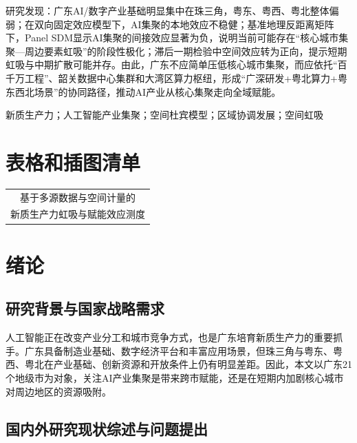 \documentclass[12pt, a4paper]{ctexart}
\makeatletter
\newcommand{\papertitlelineone}{基于多源数据与空间计量的}
\newcommand{\papertitlelinetwo}{新质生产力虹吸与赋能效应测度}
\newcommand{\paperdisplaytitle}{%
    \begin{tabular}[c]{@{}c@{}}
        \papertitlelineone\\[0.18cm]
        \papertitlelinetwo
    \end{tabular}%
}
\newcommand{\paperxiaobiaosong}{\songti}
\makeatother
\begin{document}
研究发现：广东AI/数字产业基础明显集中在珠三角，粤东、粤西、粤北整体偏弱；在双向固定效应模型下，AI集聚的本地效应不稳健；基准地理反距离矩阵下，Panel SDM显示AI集聚的间接效应显著为负，说明当前可能存在“核心城市集聚—周边要素虹吸”的阶段性极化；滞后一期检验中空间效应转为正向，提示短期虹吸与中期扩散可能并存。由此，广东不应简单压低核心城市集聚，而应依托“百千万工程”、韶关数据中心集群和大湾区算力枢纽，形成“广深研发+粤北算力+粤东西北场景”的协同路径，推动AI产业从核心集聚走向全域赋能。

新质生产力；人工智能产业集聚；空间杜宾模型；区域协调发展；空间虹吸

\newpage

\tableofcontents

\newpage

\section*{表格和插图清单}
{}

\listoftables

\vspace{0.8cm}

\listoffigures

\newpage

\setcounter{page}{1}
\begin{center}
    {\paperxiaobiaosong{}\paperdisplaytitle}
\end{center}
\section{绪论}

\subsection{研究背景与国家战略需求}
人工智能正在改变产业分工和城市竞争方式，也是广东培育新质生产力的重要抓手。广东具备制造业基础、数字经济平台和丰富应用场景，但珠三角与粤东、粤西、粤北在产业基础、创新资源和开放条件上仍有明显差距。因此，本文以广东21个地级市为对象，关注AI产业集聚是带来跨市赋能，还是在短期内加剧核心城市对周边地区的资源吸附。

\subsection{国内外研究现状综述与问题提出}
\end{document}
